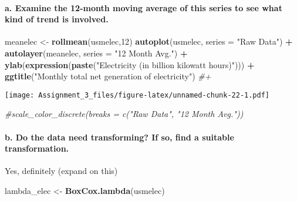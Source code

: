 \documentclass[]{article}
\newenvironment{Shaded}{\begin{snugshade}}{\end{snugshade}}
\newcommand{\KeywordTok}[1]{\textcolor[rgb]{0.13,0.29,0.53}{\textbf{#1}}}
\newcommand{\DataTypeTok}[1]{\textcolor[rgb]{0.13,0.29,0.53}{#1}}
\newcommand{\DecValTok}[1]{\textcolor[rgb]{0.00,0.00,0.81}{#1}}
\newcommand{\StringTok}[1]{\textcolor[rgb]{0.31,0.60,0.02}{#1}}
\newcommand{\CommentTok}[1]{\textcolor[rgb]{0.56,0.35,0.01}{\textit{#1}}}
\newcommand{\OperatorTok}[1]{\textcolor[rgb]{0.81,0.36,0.00}{\textbf{#1}}}
\newcommand{\NormalTok}[1]{#1}
\let\oldparagraph\paragraph
\renewcommand{\paragraph}[1]{\oldparagraph{#1}\mbox{}}
\begin{document}
\paragraph{a. Examine the 12-month moving average of this series to see
what kind of trend is
involved.}\label{a.-examine-the-12-month-moving-average-of-this-series-to-see-what-kind-of-trend-is-involved.}

\begin{Shaded}
\begin{Highlighting}[]
\NormalTok{meanelec  <-}\StringTok{ }\KeywordTok{rollmean}\NormalTok{(usmelec,}\DecValTok{12}\NormalTok{)}
\KeywordTok{autoplot}\NormalTok{(usmelec, }\DataTypeTok{series =} \StringTok{"Raw Data"}\NormalTok{) }\OperatorTok{+}
\StringTok{  }\KeywordTok{autolayer}\NormalTok{(meanelec, }\DataTypeTok{series =} \StringTok{"12 Month Avg."}\NormalTok{) }\OperatorTok{+}
\StringTok{  }\KeywordTok{ylab}\NormalTok{(}\KeywordTok{expression}\NormalTok{(}\KeywordTok{paste}\NormalTok{(}\StringTok{"Electricity (in billion kilowatt hours)"}\NormalTok{))) }\OperatorTok{+}\StringTok{ }
\StringTok{  }\KeywordTok{ggtitle}\NormalTok{(}\StringTok{"Monthly total net generation of electricity"}\NormalTok{) }\CommentTok{#+}
\end{Highlighting}
\end{Shaded}

\texttt{[image: Assignment\_3\_files/figure-latex/unnamed-chunk-22-1.pdf]}

\begin{Shaded}
\begin{Highlighting}[]
  \CommentTok{#scale_color_discrete(breaks = c("Raw Data", "12 Month Avg."))}
\end{Highlighting}
\end{Shaded}

\paragraph{b. Do the data need transforming? If so, find a suitable
transformation.}\label{b.-do-the-data-need-transforming-if-so-find-a-suitable-transformation.}

Yes, definitely (expand on this)

\begin{Shaded}
\begin{Highlighting}[]
\NormalTok{lambda_elec <-}\StringTok{ }\KeywordTok{BoxCox.lambda}\NormalTok{(usmelec)}
\end{Highlighting}
\end{Shaded}
\end{document}
